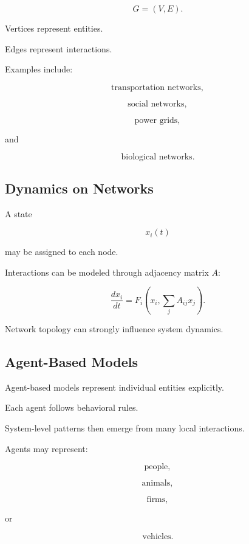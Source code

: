 \[
\boxed{
G=(V,E).
}
\]

Vertices represent entities.

Edges represent interactions.

Examples include:

\[
\boxed{
\text{transportation networks},
}
\]

\[
\boxed{
\text{social networks},
}
\]

\[
\boxed{
\text{power grids},
}
\]

and

\[
\boxed{
\text{biological networks}.
}
\]

\subsection{Dynamics on Networks}
\label{subsec:model-network-dynamics}

A state

\[
x_i(t)
\]

may be assigned to each node.

Interactions can be modeled through adjacency matrix \(A\):

\[
\boxed{
\frac{dx_i}{dt}
=
F_i
\left(
x_i,
\sum_jA_{ij}x_j
\right).
}
\]

Network topology can strongly influence system dynamics.

\subsection{Agent-Based Models}
\label{subsec:agent-based-models}

Agent-based models represent individual entities explicitly.

Each agent follows behavioral rules.

System-level patterns then emerge from many local interactions.

Agents may represent:

\[
\boxed{
\text{people},
}
\]

\[
\boxed{
\text{animals},
}
\]

\[
\boxed{
\text{firms},
}
\]

or

\[
\boxed{
\text{vehicles}.
}
\]

